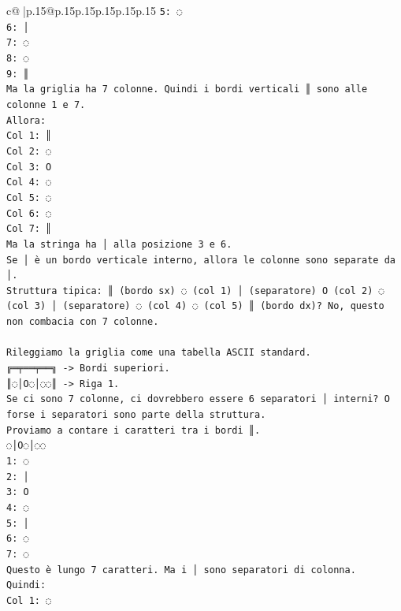 \documentclass{article}
\begin{document}
{\begin{supertabular}{c@{$\;$}|p{.15\linewidth}@{}p{.15\linewidth}p{.15\linewidth}p{.15\linewidth}p{.15\linewidth}p{.15\linewidth}}
{{{\texttt{5: ◌} \\
\texttt{6: │} \\
\texttt{7: ◌} \\
\texttt{8: ◌} \\
\texttt{9: ║} \\
\texttt{Ma la griglia ha 7 colonne. Quindi i bordi verticali ║ sono alle colonne 1 e 7.} \\
\texttt{Allora:} \\
\texttt{Col 1: ║} \\
\texttt{Col 2: ◌} \\
\texttt{Col 3: O} \\
\texttt{Col 4: ◌} \\
\texttt{Col 5: ◌} \\
\texttt{Col 6: ◌} \\
\texttt{Col 7: ║} \\
\texttt{Ma la stringa ha │ alla posizione 3 e 6.} \\
\texttt{Se │ è un bordo verticale interno, allora le colonne sono separate da │.} \\
\texttt{Struttura tipica: ║ (bordo sx) ◌ (col 1) │ (separatore) O (col 2) ◌ (col 3) │ (separatore) ◌ (col 4) ◌ (col 5) ║ (bordo dx)? No, questo non combacia con 7 colonne.} \\
\\ 
\texttt{Rileggiamo la griglia come una tabella ASCII standard.} \\
\texttt{╔═╤══╤══╗ {-}> Bordi superiori.} \\
\texttt{║◌│O◌│◌◌║ {-}> Riga 1.} \\
\texttt{Se ci sono 7 colonne, ci dovrebbero essere 6 separatori │ interni? O forse i separatori sono parte della struttura.} \\
\texttt{Proviamo a contare i caratteri tra i bordi ║.} \\
\texttt{◌│O◌│◌◌} \\
\texttt{1: ◌} \\
\texttt{2: │} \\
\texttt{3: O} \\
\texttt{4: ◌} \\
\texttt{5: │} \\
\texttt{6: ◌} \\
\texttt{7: ◌} \\
\texttt{Questo è lungo 7 caratteri. Ma i │ sono separatori di colonna.} \\
\texttt{Quindi:} \\
\texttt{Col 1: ◌} \\
}}}
\end{supertabular}}
\end{document}
